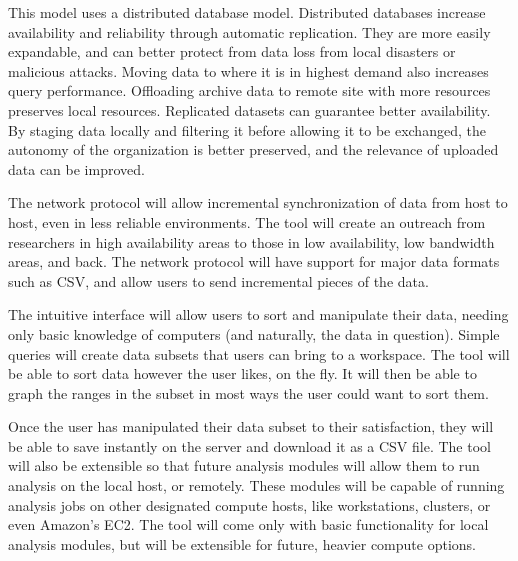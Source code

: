 This model uses a distributed database model.
Distributed databases increase availability and reliability through automatic
replication. They are more
easily expandable, and can better protect from data loss from local disasters or
malicious attacks. Moving data to where it is in highest demand also increases
query performance. Offloading archive data to remote site with more 
resources preserves local resources. Replicated datasets can guarantee 
better availability. By staging data locally and filtering it before allowing
it to be exchanged, the autonomy of the organization is better preserved, and the
relevance of uploaded data can be improved. 

The network protocol will allow incremental synchronization of data from host
to host, even in less reliable environments. The tool will create
an outreach from researchers in high availability areas to those
in low availability, low bandwidth areas, and back. The network protocol
will have support for major data formats such as CSV, and allow
users to send incremental pieces of the data.

The intuitive interface will allow users to sort and manipulate their data,
needing only basic knowledge of computers (and naturally, the data in
question). Simple queries will create data subsets that users can bring to
a workspace. The tool will be able to sort data however the user likes, on the
fly. It will then be able to graph the ranges in the subset in most ways the
user could want to sort them.

Once the user has manipulated their data subset to their satisfaction, they
will be able to save instantly on the server and download it as a CSV file. The
tool will also be extensible so that future analysis modules will allow them to
run analysis on the local host, or remotely. These modules will be capable of
running analysis jobs on other designated compute hosts, like workstations,
clusters, or even Amazon's EC2. The tool will come only with basic
functionality for local analysis modules, but will be extensible for future, heavier
compute options.


